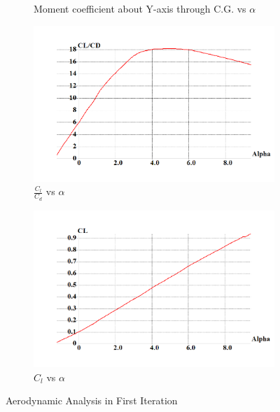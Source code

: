 \begin{figure}[H]
\begin{subfigure}{0.6\textwidth}
\caption{Moment coefficient about Y-axis through C.G. vs $\alpha$}
\end{subfigure}
\medskip
\begin{subfigure}{0.6\textwidth}
\includegraphics[width = \linewidth]{clcd_vs_alpha.png}
\caption{$\frac{C_l}{C_d}$ vs $\alpha$}
\end{subfigure}
\begin{subfigure}{0.6\textwidth}
\includegraphics[width = \linewidth]{cl_vs_alpha.png}
\caption{$C_l$ vs $\alpha$}
\end{subfigure}
\caption{Aerodynamic Analysis in First Iteration}
\end{figure}
